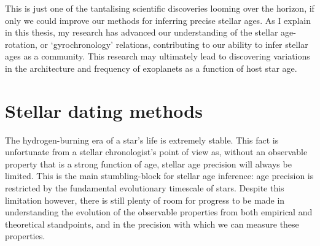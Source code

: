 This is just one of the tantalising scientific discoveries looming over the
horizon, if only we could improve our methods for inferring precise stellar
ages.
As I explain in this thesis, my research has advanced our understanding of the
stellar age-rotation, or `gyrochronology' relations, contributing to our
ability to infer stellar ages as a community.
This research may ultimately lead to discovering variations in the
architecture and frequency of exoplanets as a function of host star age.


\section{Stellar dating methods}

The hydrogen-burning era of a star's life is extremely stable.
This fact is unfortunate from a stellar chronologist's point of view as,
without an observable property that is a strong function of age, stellar age
precision will always be limited.
This is the main stumbling-block for stellar age inference: age precision is
restricted by the fundamental evolutionary timescale of stars.
Despite this limitation however, there is still plenty of room for progress to
be made in understanding the evolution of the observable properties from both
empirical and theoretical standpoints, and in the precision with which we can
measure these properties.

